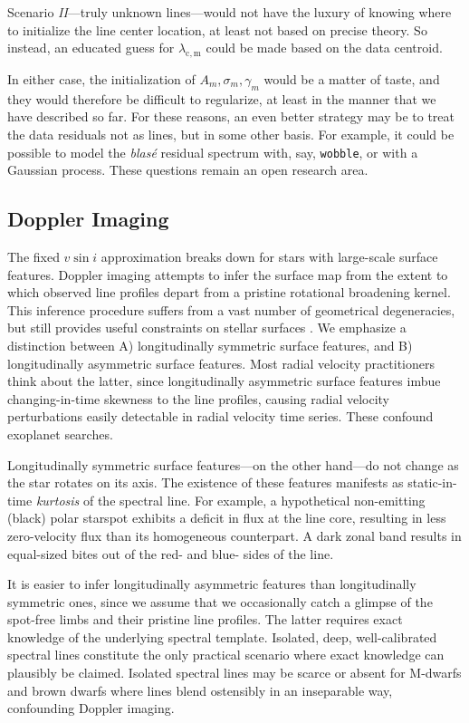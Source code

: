 \documentclass[twocolumn]{aastex631}
\begin{document}
\noindent Scenario \emph{II}---truly unknown lines---would not have the luxury of knowing where to initialize the line center location, at least not based on precise theory.  So instead, an educated guess for $\lambda_\mathrm{c,m}$ could be made based on the data centroid.

In either case, the initialization of $A_m, \sigma_m, \gamma_m$ would be a matter of taste, and they would therefore be difficult to regularize, at least in the manner that we have described so far.  For these reasons, an even better strategy may be to treat the data residuals not as lines, but in some other basis.  For example, it could be possible to model the \emph{blas\'e} residual spectrum with, say, \texttt{wobble}, or with a Gaussian process.  These questions remain an open research area.


\subsection{Doppler Imaging}
The fixed $v\sin{i}$ approximation breaks down for stars with large-scale surface features.  Doppler imaging attempts to infer the surface map from the extent to which observed line profiles depart from a pristine rotational broadening kernel.  This inference procedure suffers from a vast number of geometrical degeneracies, but still provides useful constraints on stellar surfaces \citep{2021arXiv211006271L}.  We emphasize a distinction between A) longitudinally symmetric surface features, and B) longitudinally asymmetric surface features.  Most radial velocity practitioners think about the latter, since longitudinally asymmetric surface features imbue changing-in-time skewness to the line profiles, causing radial velocity perturbations easily detectable in radial velocity time series.  These confound exoplanet searches.

Longitudinally symmetric surface features---on the other hand---do not change as the star rotates on its axis.  The existence of these features manifests as static-in-time \emph{kurtosis} of the spectral line.  For example, a hypothetical non-emitting (black) polar starspot exhibits a deficit in flux at the line core, resulting in less zero-velocity flux than its homogeneous counterpart.  A dark zonal band results in equal-sized bites out of the red- and blue- sides of the line.

It is easier to infer longitudinally asymmetric features than longitudinally symmetric ones, since we assume that we occasionally catch a glimpse of the spot-free limbs and their pristine line profiles.
The latter requires exact knowledge of the underlying spectral template.  Isolated, deep, well-calibrated spectral lines constitute the only practical scenario where exact knowledge can plausibly be claimed.  Isolated spectral lines may be scarce or absent for M-dwarfs and brown dwarfs where lines blend ostensibly in an inseparable way, confounding Doppler imaging.
\end{document}
